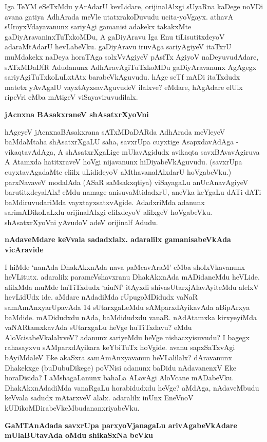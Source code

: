 Iga TeYM eSeTxMdu yArAdarU kevLidare, orijinalAlxgi sUyaRna kaDege noVDi avana gatiya AdhArada meVle utatxrakoDuvudu ucita-yoVgayx. athavA sUroyxVdayavanunx sariyAgi gamanisi adakekx takakxMte gaDiyAravaninxTuTxkoMDu, A gaDiyAravu Iga Enu tiLisutitxdeyoV adaraMtAdarU hevLabeVku. gaDiyAravu iruvAga sariyAgiyeV itaTxrU muMdakekx naDeya horaTAga solxVvAgiyeV pAsfTx AgiyoV  naDeyuvudAdare, sATxMDaDfR Adudanunx AdhAravAgiTuTxkoMDu gaDiyAravanunx AgAgegx sariyAgiTuTxkoLuLxtAtx barabeVkAguvudu. hAge seTf mADi itaTxdudx matetx yAvAgalU vayxtAyxsavAguvudeV ilalxve? eMdare, hAgAdare elUlx ripeVri eMba mAtigeV viSayaviruvudilalx.

{\bf jAcnxna BAsakxraneV shAsatxrXyoVni}

hAgeyeV jAcnxnaBAsakxrana sATxMDaDARda AdhArada meVleyeV baMdaMtaha shAsatxrXgaLU saha, savxrUpa cuyxtige AsapxdavAdAga - vikaqtavAdAga, A shAsatxrXgaLige mUlavAgidudx avikaqta savxBAvavAgiruva A Atamxda hatitxraveV hoVgi nijavanunx hiDiyabeVkAguvudu. (savxrUpa cuyxtavAgadaMte eliilx uLidideyoV aMthavanalAlxdarU hoVgabeVku.) parxNavaveV modalAda (ASaR saMsakxqtiya) viSayagaLu anUcAnavAgiyeV barutitxdeyalAlx! eMdu namage anisuvaMtidadxrU, aneVka keYgaLu dATi dATi baMdiruvudariMda vayxtayxsatxvAgide. AdadxriMda adanunx sarimADikoLaLxlu orijinalAlxgi elilxdeyoV alilxgeV hoVgabeVku. shAsatxrXyoVni yAvudoV adeV orijinalf Adudu.

{\bf nAdaveMdare keVvala sadadxlalx. adaralilx gamanisabeVkAda vicAravide}

I hiMde `nanAda DhakAkxnAda nava paMcavAraM' eMba sholxVkavanunx heVLitutx. adaralilx parameVshavxranu DhakAkxnAda mADidaneMdu heVLide. alilxMda muMde huTiTxdudx `aiuNf' itAyxdi shivasUtarxjAlavAyiteMdu alelxV hevLidUdx ide. aMdare nAdadiMda rUpugoMDidudx vaNaR samAmAnxyarUpavAda 14 sUtarxgaLeMdu sAMparxdAyikavAda aBipArxya baMdide. mADidudxdu nAda, baMdidudxdu vanaR. nAdAtamxka kirxyeyiMda vaNARtamxkavAda sUtarxgaLu heVge huTiTxdavu? eMdu AloVcisabeVkalalxveV? adanunx sariyeMdu heVge nishacxyisuvudu? I bagegx rahasayxvu sAMparxdAyikara keYbiTuTx hoVgide. avanu sapxSaTxvAgi bAyiMdaleV Eke akaSxra samAmAnxyavanun heVLalilalx? dAravanunx Dhakekxge (buDubuDikege) poVNisi adanunx baDidu nAdavanenxV Eke horaDisida? I aMshagaLanunx bahaLa ALavAgi AloVcane mADabeVku. DhakAkxnAdadiMda vanaRgaLu horabidudxdu heVge? aMdAga, nAdaveMbudu keVvala sadudx mAtarxveV alalx. adaralilx inUnx EneVnoV kUDikoMDirabeVkeMbudananxriyabeVku.

{\bf GaMTAnAdada savxrUpa parxyoVjanagaLu arivAgabeVkAdare mUlaBUtavAda oMdu shikaSxNa beVku}

